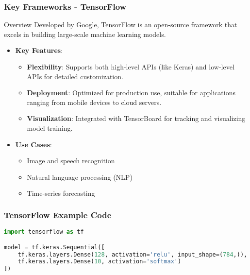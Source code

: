 \documentclass[aspectratio=169]{beamer}
\begin{document}
\begin{frame}
    \frametitle{Key Frameworks - TensorFlow}
    \begin{block}{Overview}
        Developed by Google, TensorFlow is an open-source framework that excels 
        in building large-scale machine learning models.
    \end{block}
    
    \begin{itemize}
        \item \textbf{Key Features}:
        \begin{itemize}
            \item \textbf{Flexibility}: Supports both high-level APIs (like Keras) 
                  and low-level APIs for detailed customization.
            \item \textbf{Deployment}: Optimized for production use, suitable 
                  for applications ranging from mobile devices to cloud servers.
            \item \textbf{Visualization}: Integrated with TensorBoard for tracking 
                  and visualizing model training.
        \end{itemize}
        \item \textbf{Use Cases}:
        \begin{itemize}
            \item Image and speech recognition
            \item Natural language processing (NLP)
            \item Time-series forecasting
        \end{itemize}
    \end{itemize}
\end{frame}

\begin{frame}[fragile]
    \frametitle{TensorFlow Example Code}
    \begin{lstlisting}[language=Python]
import tensorflow as tf

model = tf.keras.Sequential([
    tf.keras.layers.Dense(128, activation='relu', input_shape=(784,)),
    tf.keras.layers.Dense(10, activation='softmax')
])
    \end{lstlisting}
\end{frame}
\end{document}
